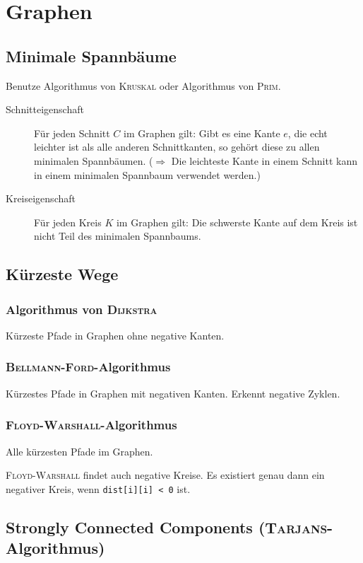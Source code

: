\section{Graphen}

\subsection{Minimale Spannbäume}
Benutze Algorithmus von \textsc{Kruskal} oder Algorithmus von \textsc{Prim}.
\begin{description}
	\item[Schnitteigenschaft] Für jeden Schnitt $C$ im Graphen gilt: Gibt es eine Kante $e$, die echt leichter ist als alle anderen Schnittkanten, so gehört diese zu allen minimalen Spannbäumen. ($\Rightarrow$ Die leichteste Kante in einem Schnitt kann in einem minimalen Spannbaum verwendet werden.)
	\item[Kreiseigenschaft] Für jeden Kreis $K$ im Graphen gilt: Die schwerste Kante auf dem Kreis ist nicht Teil des minimalen Spannbaums.
\end{description}

\subsection{Kürzeste Wege}

\subsubsection{Algorithmus von \textsc{Dijkstra}}
Kürzeste Pfade in Graphen ohne negative Kanten.


\subsubsection{\textsc{Bellmann-Ford}-Algorithmus}
Kürzestes Pfade in Graphen mit negativen Kanten. Erkennt negative Zyklen.


\subsubsection{\textsc{Floyd-Warshall}-Algorithmus}
Alle kürzesten Pfade im Graphen.

\textsc{Floyd-Warshall} findet auch negative Kreise. Es existiert genau dann ein negativer Kreis, wenn \lstinline{dist[i][i] < 0} ist.

\subsection{Strongly Connected Components (\textsc{Tarjans}-Algorithmus)}


